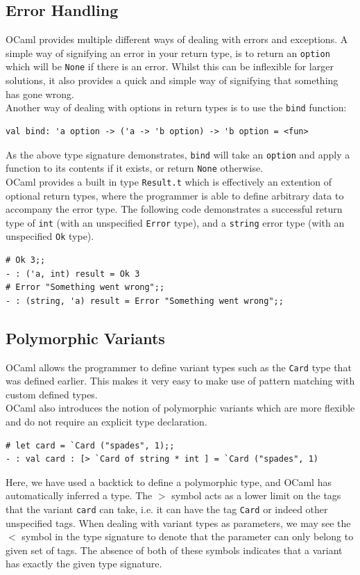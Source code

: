 \documentclass[12pt,a4paper,twoside,openright]{report}
\begin{document}
		\subsection{Error Handling}
		OCaml provides multiple different ways of dealing with errors and exceptions. 
		A simple way of signifying an error in your return type, is to return an \texttt{option} which will be \texttt{None} if there is an error. 
		Whilst this can be inflexible for larger solutions, it also provides a quick and simple way of signifying that something has gone wrong.\\

		Another way of dealing with options in return types is to use the \texttt{bind} function:
		\begin{lstlisting}
val bind: 'a option -> ('a -> 'b option) -> 'b option = <fun>
		\end{lstlisting} 
		As the above type signature demonstrates, \texttt{bind} will take an \texttt{option} and apply a function to its contents if it exists, or return \texttt{None} otherwise.\\
		
		OCaml provides a built in type \texttt{Result.t} which is effectively an extention of optional return types, where the programmer is able to define arbitrary data to accompany the error type. The following code demonstrates a successful return type of \texttt{int} (with an unspecified \texttt{Error} type), and a \texttt{string} error type (with an unspecified \texttt{Ok} type).
		\begin{lstlisting}
# Ok 3;;
- : ('a, int) result = Ok 3
# Error "Something went wrong";;
- : (string, 'a) result = Error "Something went wrong";;
		\end{lstlisting} 

		\subsection{Polymorphic Variants}
		OCaml allows the programmer to define variant types such as the \texttt{Card} type that was defined earlier. This makes it very easy to make use of pattern matching with custom defined types.\\
		
		OCaml also introduces the notion of polymorphic variants which are more flexible and do not require an explicit type declaration.
		\begin{lstlisting}
# let card = `Card ("spades", 1);;
- : val card : [> `Card of string * int ] = `Card ("spades", 1)
		\end{lstlisting}
		Here, we have used a backtick to define a polymorphic type, and OCaml has automatically inferred a type. 
		The $>$ symbol acts as a lower limit on the tags that the variant \texttt{card} can take, i.e. it can have the tag \texttt{Card} or indeed other unspecified tags.
		When dealing with variant types as parameters, we may see the $<$ symbol in the type signature to denote that the parameter can only belong to given set of tags. The absence of both of these symbols indicates that a variant has exactly the given type signature. 
\end{document}
